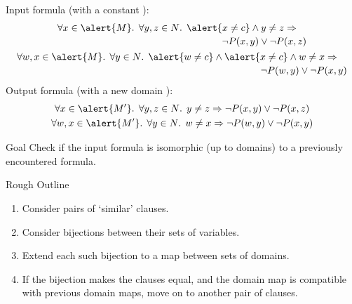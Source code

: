 \documentclass{beamer}
\begin{document}
\begin{frame}
\begin{columns}
\begin{column}{0.85\textwidth}
\begin{overprint}
          \begin{example}
            Input formula (with a constant ):
            \begin{gather*}
              \begin{multlined}
                \forall x \in \alert{M}\text{. }\forall y, z \in N\text{. }\alert{x \ne c} \land y \ne z \Rightarrow \\
                \neg P(x, y) \lor \neg P(x, z)
              \end{multlined} \\
              \begin{multlined}
                \forall w,x \in \alert{M}\text{. }\forall y \in N\text{. }\alert{w \ne c} \land \alert{x \ne c} \land w \ne x \Rightarrow \\
                \neg P(w, y) \lor \neg P(x, y)
              \end{multlined}
            \end{gather*}
            Output formula (with a new domain ):
            \begin{gather*}
              \forall x \in \alert{M'}\text{. }\forall y, z \in N\text{. }y \ne z \Rightarrow \neg P(x, y) \lor \neg P(x, z) \\
              \forall w,x \in \alert{M'}\text{. }\forall y \in N\text{. }w \ne x \Rightarrow \neg P(w, y) \lor \neg P(x, y)
            \end{gather*}
          \end{example}
          \begin{block}{Goal}
            Check if the input formula is isomorphic (up to domains) to a
            previously encountered formula.
          \end{block}
          \begin{block}{Rough Outline}
            \begin{enumerate}
              \item Consider pairs of `similar' clauses.
              \item Consider bijections between their sets of variables.
              \item Extend each such bijection to a map between sets of domains.
              \item If the bijection makes the clauses equal, and the domain map
                    is compatible with previous domain maps, move on to another
                    pair of clauses.
            \end{enumerate}
          \end{block}
      \end{overprint}
    \end{column}
  \end{columns}
\end{frame}
\end{document}
